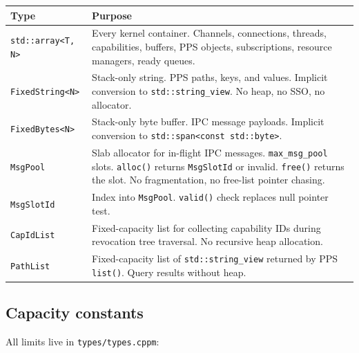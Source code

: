 \documentclass[11pt]{article}
\begin{document}
\begin{longtable}{lp{9cm}}
\toprule
\textbf{Type} & \textbf{Purpose} \\
\midrule
\texttt{std::array<T, N>}
  & Every kernel container.  Channels, connections, threads,
    capabilities, buffers, PPS objects, subscriptions, resource
    managers, ready queues. \\
\texttt{FixedString<N>}
  & Stack-only string.  PPS paths, keys, and values.
    Implicit conversion to \texttt{std::string\_view}.
    No heap, no SSO, no allocator. \\
\texttt{FixedBytes<N>}
  & Stack-only byte buffer.  IPC message payloads.
    Implicit conversion to \texttt{std::span<const std::byte>}. \\
\texttt{MsgPool}
  & Slab allocator for in-flight IPC messages.
    \texttt{max\_msg\_pool} slots.  \texttt{alloc()} returns
    \texttt{MsgSlotId} or invalid.  \texttt{free()} returns
    the slot.  No fragmentation, no free-list pointer chasing. \\
\texttt{MsgSlotId}
  & Index into \texttt{MsgPool}.  \texttt{valid()} check
    replaces null pointer test. \\
\texttt{CapIdList}
  & Fixed-capacity list for collecting capability IDs during
    revocation tree traversal.  No recursive heap allocation. \\
\texttt{PathList}
  & Fixed-capacity list of \texttt{std::string\_view} returned
    by PPS \texttt{list()}.  Query results without heap. \\
\bottomrule
\end{longtable}

\subsection{Capacity constants}

All limits live in \texttt{types/types.cppm}:
\end{document}
